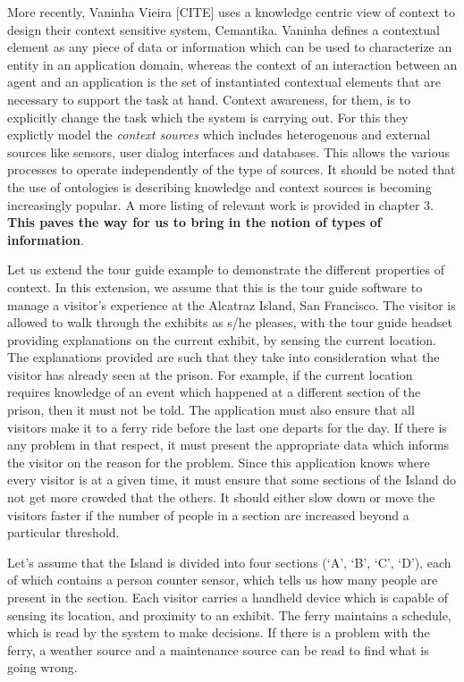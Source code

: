 More recently, Vaninha Vieira [CITE] uses a knowledge centric view of context to design their context sensitive system, Cemantika. Vaninha defines a contextual element as any piece of data or information which can be used to characterize an entity in an application domain, whereas the context of an interaction between an agent and an application is the set of instantiated contextual elements that are necessary to support the task at hand. Context awareness, for them, is to explicitly change the task which the system is carrying out. For this they explictly model the \textit{context sources} which includes heterogenous and  external sources like sensors, user dialog interfaces and databases. This allows the various processes to operate independently of the type of sources. It should be noted that the use of ontologies is describing knowledge and context sources is becoming increasingly popular. A more listing of relevant work is provided in chapter 3. \textbf{This paves the way for us to bring in the notion of types of information}.

Let us extend the tour guide example to demonstrate the different properties of context. In this extension, we assume that this is the tour guide software to manage a visitor's experience at the Alcatraz Island, San Francisco. The visitor is allowed to walk through the exhibits as s/he pleases, with the tour guide headset providing explanations on the current exhibit, by sensing the current location. The explanations provided are such that they take into consideration what the visitor has already seen at the prison. For example, if the current location requires knowledge of an event which happened at a different section of the prison, then it must not be told. The application must also ensure that all visitors make it to a ferry ride before the last one departs for the day. If there is any problem in that respect, it must present the appropriate data which informs the visitor on the reason for the problem. Since this application knows where every visitor is at a given time, it must ensure that some sections of the Island do not get more crowded that the others. It should either slow down or move the visitors faster if the number of people in a section are increased beyond a particular threshold.

Let's assume that the Island is divided into four sections (`A', `B', `C', `D'), each of which contains a person counter sensor, which tells us how many people are present in the section. Each visitor carries a handheld device which is capable of sensing its location, and proximity to an exhibit. The ferry maintains a schedule, which is read by the system to make decisions. If there is a problem with the ferry, a weather source and a maintenance source can be read to find what is going wrong.

